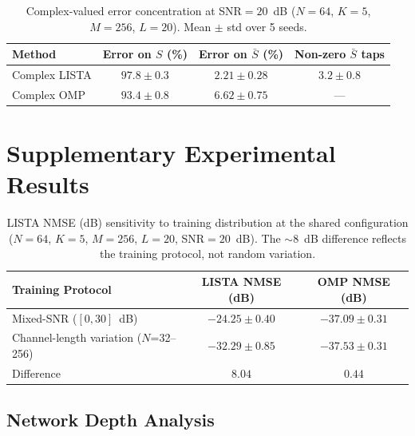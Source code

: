 \documentclass[a4paper,fleqn]{cas-sc}
\begin{document}
\begin{table}[width=.85\linewidth,cols=4,pos=!htbp]
\caption{Complex-valued error concentration at SNR$=20$~dB ($N=64$, $K=5$, $M=256$, $L=20$). Mean $\pm$ std over 5 seeds.}\label{tab:complex_error}
\begin{tabular*}{\tblwidth}{@{} LCCC@{}}
\toprule
Method & Error on $S$ (\%) & Error on $\bar{S}$ (\%) & Non-zero $\bar{S}$ taps \\
\midrule
Complex LISTA & $97.8 \pm 0.3$ & $2.21 \pm 0.28$ & $3.2 \pm 0.8$ \\
Complex OMP   & $93.4 \pm 0.8$ & $6.62 \pm 0.75$ & --- \\
\bottomrule
\end{tabular*}
\end{table}

\clearpage
\section{Supplementary Experimental Results}\label{sec:supp_experiments}

\begin{table}[width=.7\linewidth,cols=3,pos=!htbp]
\caption{LISTA NMSE (dB) sensitivity to training distribution at the shared configuration ($N=64$, $K=5$, $M=256$, $L=20$, SNR$=20$~dB). The $\sim$8~dB difference reflects the training protocol, not random variation.}\label{tab:cross_table}
\begin{tabular*}{\tblwidth}{@{} LCC@{}}
\toprule
Training Protocol & LISTA NMSE (dB) & OMP NMSE (dB) \\
\midrule
Mixed-SNR ($[0, 30]$~dB)          & $-24.25 \pm 0.40$ & $-37.09 \pm 0.31$ \\
Channel-length variation ($N$=32--256) & $-32.29 \pm 0.85$ & $-37.53 \pm 0.31$ \\
\midrule
Difference & $\mathbf{8.04}$ & $0.44$ \\
\bottomrule
\end{tabular*}
\end{table}



\subsection{Network Depth Analysis}\label{sec:supp_convergence}
\end{document}
